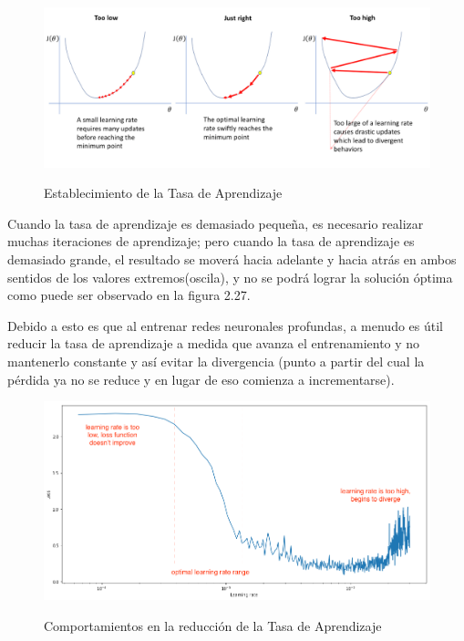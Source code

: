 		\begin{figure}[H]
		\includegraphics[width=1\textwidth]{images/desarrollo/entrenamiento/LR}
		\begin{center}
		\caption{\small{Establecimiento de la Tasa de Aprendizaje}}
		\vspace{-0.5em}
		{\small{\cite{AdamImg}}}
		\end{center}
		\vspace{-1.5em}
		\end{figure}

		Cuando la tasa de aprendizaje es demasiado pequeña, es necesario realizar muchas iteraciones de aprendizaje; pero cuando la tasa de aprendizaje es demasiado grande, el resultado se moverá hacia adelante y hacia atrás en ambos sentidos de los valores extremos(oscila), y no se podrá lograr la solución óptima como puede ser observado en la figura 2.27.

		Debido a esto es que al entrenar redes neuronales profundas, a menudo es útil reducir la tasa de aprendizaje a medida que avanza el entrenamiento y no mantenerlo constante y así evitar la divergencia (punto a partir del cual la pérdida ya no se reduce y en lugar de eso comienza a incrementarse).


		\begin{figure}[H]
		\includegraphics[width=1\textwidth]{images/desarrollo/entrenamiento/lr_finder}
		\begin{center}
		\caption{\small{Comportamientos en la reducción de la Tasa de Aprendizaje}}
		{\small{\cite{AdamImg}}}
		\end{center}
		\vspace{-1.5em}
		\end{figure}

